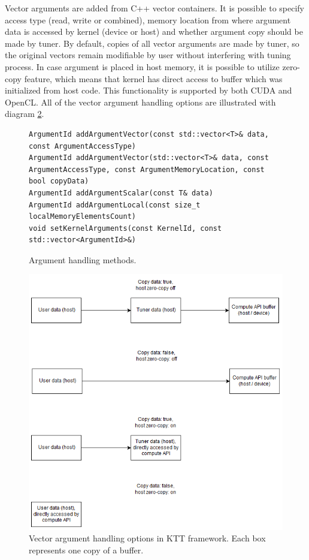 \documentclass
[
    digital, %
    oneside, %
    table, %
    nolof, %
    nolot, %
    nocover %
]{fithesis3}
\begin{document}
Vector arguments are added from C++ vector containers. It is possible to specify access type (read, write or combined), memory location from where
argument data is accessed by kernel (device or host) and whether argument copy should be made by tuner. By default, copies of all vector arguments
are made by tuner, so the original vectors remain modifiable by user without interfering with tuning process. In case argument is placed in host
memory, it is possible to utilize zero-copy feature, which means that kernel has direct access to buffer which was initialized from host code. This
functionality is supported by both CUDA and OpenCL. All of the vector argument handling options are illustrated with diagram \ref{ktt-buffer-diagram}.

\begin{figure}
\begin{lstlisting}
ArgumentId addArgumentVector(const std::vector<T>& data, const ArgumentAccessType)
ArgumentId addArgumentVector(std::vector<T>& data, const ArgumentAccessType, const ArgumentMemoryLocation, const bool copyData)
ArgumentId addArgumentScalar(const T& data)
ArgumentId addArgumentLocal(const size_t localMemoryElementsCount)
void setKernelArguments(const KernelId, const std::vector<ArgumentId>&)
\end{lstlisting}
\caption{Argument handling methods.}
\label{ktt-argument-methods}
\end{figure}

\begin{figure}
\begin{center}
\includegraphics[width=125mm]{resources/ktt_buffer_diagram.png}
\end{center}
\caption{Vector argument handling options in KTT framework. Each box represents one copy of a buffer.}
\label{ktt-buffer-diagram}
\end{figure}
\end{document}
